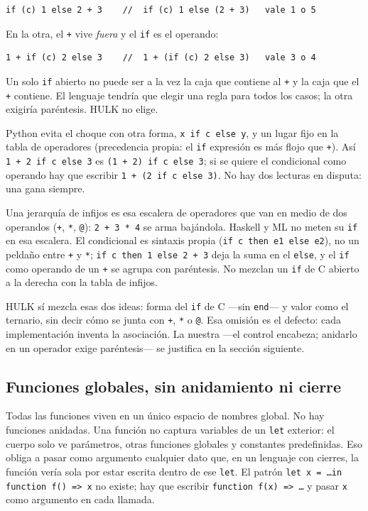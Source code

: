 \documentclass[11pt,a4paper]{article}
\begin{document}
\begin{lstlisting}[language={},numbers=none]
if (c) 1 else 2 + 3    //  if (c) 1 else (2 + 3)   vale 1 o 5
\end{lstlisting}

En la otra, el \texttt{+} vive \emph{fuera} y el \texttt{if} es el operando:

\begin{lstlisting}[language={},numbers=none]
1 + if (c) 2 else 3    //  1 + (if (c) 2 else 3)   vale 3 o 4
\end{lstlisting}

Un solo \texttt{if} abierto no puede ser a la vez la caja que contiene al \texttt{+} y la caja que el \texttt{+} contiene. El lenguaje tendría que elegir una regla para todos los casos; la otra exigiría paréntesis. HULK no elige.

Python evita el choque con otra forma, \texttt{x if c else y}, y un lugar fijo en la tabla de operadores (precedencia propia: el \texttt{if} expresión es más flojo que \texttt{+}). Así \texttt{1 + 2 if c else 3} es \texttt{(1 + 2) if c else 3}; si se quiere el condicional como operando hay que escribir \texttt{1 + (2 if c else 3)}. No hay dos lecturas en disputa: una gana siempre.

Una jerarquía de infijos es esa escalera de operadores que van en medio de dos operandos (\texttt{+}, \texttt{*}, \texttt{@}): \texttt{2 + 3 * 4} se arma bajándola. Haskell y ML no meten su \texttt{if} en esa escalera. El condicional es sintaxis propia (\texttt{if c then e1 else e2}), no un peldaño entre \texttt{+} y \texttt{*}; \texttt{if c then 1 else 2 + 3} deja la suma en el \texttt{else}, y el \texttt{if} como operando de un \texttt{+} se agrupa con paréntesis. No mezclan un \texttt{if} de C abierto a la derecha con la tabla de infijos.

HULK sí mezcla esas dos ideas: forma del \texttt{if} de C ---sin \texttt{end}--- y valor como el ternario, sin decir cómo se junta con \texttt{+}, \texttt{*} o \texttt{@}. Esa omisión es el defecto: cada implementación inventa la asociación. La nuestra ---el control encabeza; anidarlo en un operador exige paréntesis--- se justifica en la sección siguiente.

\subsection{Funciones globales, sin anidamiento ni cierre}

Todas las funciones viven en un único espacio de nombres global. No hay funciones anidadas. Una función no captura variables de un \texttt{let} exterior: el cuerpo solo ve parámetros, otras funciones globales y constantes predefinidas. Eso obliga a pasar como argumento cualquier dato que, en un lenguaje con cierres, la función vería sola por estar escrita dentro de ese \texttt{let}. El patrón \texttt{let x = \ldots in function f() => x} no existe; hay que escribir \texttt{function f(x) => \ldots} y pasar \texttt{x} como argumento en cada llamada.
\end{document}
